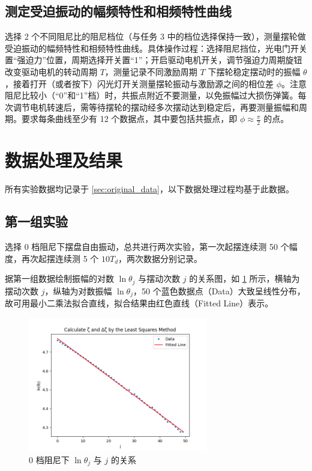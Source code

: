 \documentclass[12pt,a4paper]{amsart}
\begin{document}
\subsection{测定受迫振动的幅频特性和相频特性曲线}

选择 2 个不同阻尼比的阻尼档位（与任务 3 中的档位选择保持一致），测量摆轮做受迫振动的幅频特性和相频特性曲线。具体操作过程：选择阻尼挡位，光电门开关置“强迫力”位置，周期选择开关置“1”；开启驱动电机开关，调节强迫力周期旋钮改变驱动电机的转动周期 $T$，测量记录不同激励周期 $T$ 下摆轮稳定摆动时的振幅 $\theta$，接着打开（或者按下）闪光灯开关测量摆轮振动与激励源之间的相位差 $\phi$。注意阻尼比较小（“0”和“1”档）时，共振点附近不要测量，以免振幅过大损伤弹簧。每次调节电机转速后，需等待摆轮的摆动经多次摆动达到稳定后，再要测量振幅和周期。要求每条曲线至少有 12 个数据点，其中要包括共振点，即 $\phi\approx\frac{\pi}{2}$ 的点。

\section{数据处理及结果}

所有实验数据均记录于 \ref{sec:original_data}，以下数据处理过程均基于此数据。

\subsection{第一组实验}\label{sec:1}

选择 0 档阻尼下摆盘自由振动，总共进行两次实验，第一次起摆连续测 50 个幅度，再次起摆连续测 5 个 $10T_d$，两次数据分别记录。

据第一组数据绘制振幅的对数 $\ln\theta_j$ 与摆动次数 $j$ 的关系图，如 \ref{fig:ln_theta_j} 所示，横轴为摆动次数 $j$，纵轴为对数振幅 $\ln\theta_j$，50 个蓝色数据点（Data）大致呈线性分布，故可用最小二乘法拟合直线，拟合结果由红色直线（Fitted Line）表示。

\begin{figure}[H]
	\centering
	\includegraphics[width=0.7\textwidth]{img/A.png}
	\caption{0 档阻尼下 $\ln\theta_j$ 与 $j$ 的关系}
	\label{fig:ln_theta_j}
\end{figure}
\end{document}
